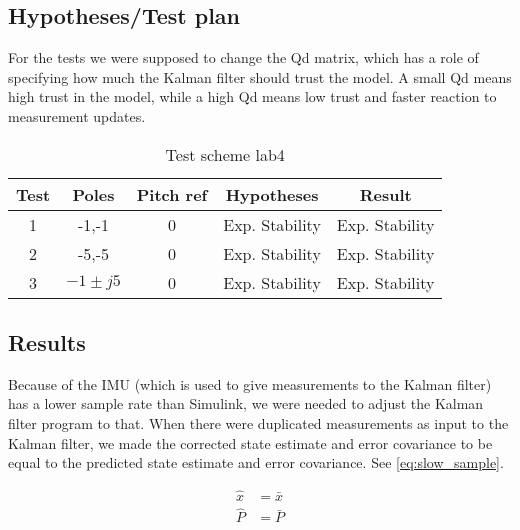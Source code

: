 \subsection{Hypotheses/Test plan}
For the tests we were supposed to change the Qd matrix, which has a role of specifying how much the Kalman filter should trust the model. A small Qd 
means high trust in the model, while a high Qd means low trust and faster reaction to measurement updates. 
\begin{table}[h]
    \centering
        \begin{tabular}{||c c c c c||} 
         \hline
         Test & Poles & Pitch ref & Hypotheses & Result \\ [0.5ex] 
         \hline\hline
         1 & -1,-1 & 0 & Exp. Stability & Exp. Stability \\ 
         \hline
         2 & -5,-5 & 0 & Exp. Stability & Exp. Stability \\
         \hline
         3 & $-1\pm j5$  & 0 & Exp. Stability & Exp. Stability  \\ [1ex]
         \hline
        \end{tabular}
        \label{tab:testskjema_lab4}
        \caption{Test scheme lab4}
    \end{table}
\subsection{Results}
Because of the IMU (which is used to give measurements to the Kalman filter) has a lower 
sample rate than Simulink, we were needed to adjust the Kalman filter program to that. 
When there were duplicated measurements as input to the Kalman filter, we made the corrected
state estimate and error covariance to be equal to the predicted state estimate and error covariance. See \ref{eq:slow_sample}.

\begin{subequations}\label{eq:slow_sample}
    \begin{align}
    \hat{x} &= \bar{x}  \label{eq:bad_sample_x} \\
    \hat{P} &= \bar{P} \label{eq:bad_sample_p} \\
    \end{align}
\end{subequations}

